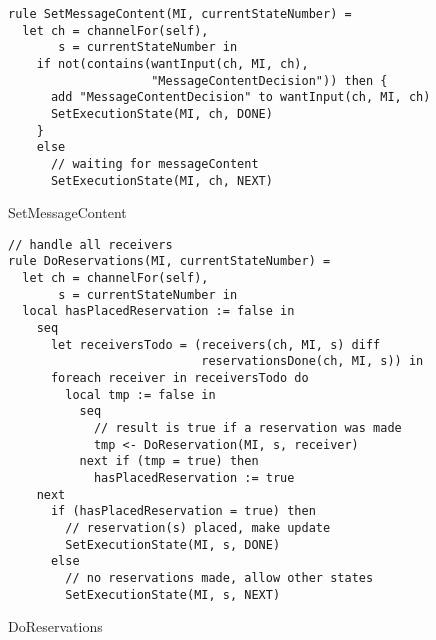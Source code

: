 \begin{listing}[H]
\begin{verbatim}
rule SetMessageContent(MI, currentStateNumber) =
  let ch = channelFor(self),
       s = currentStateNumber in
    if not(contains(wantInput(ch, MI, ch),
                    "MessageContentDecision")) then {
      add "MessageContentDecision" to wantInput(ch, MI, ch)
      SetExecutionState(MI, ch, DONE)
    }
    else
      // waiting for messageContent
      SetExecutionState(MI, ch, NEXT)
\end{verbatim}
\caption{SetMessageContent}
\label{lst:asm:SetMessageContent}
\end{listing}




\begin{listing}[H]
\begin{verbatim}
// handle all receivers
rule DoReservations(MI, currentStateNumber) =
  let ch = channelFor(self),
       s = currentStateNumber in
  local hasPlacedReservation := false in
    seq
      let receiversTodo = (receivers(ch, MI, s) diff
                           reservationsDone(ch, MI, s)) in
      foreach receiver in receiversTodo do
        local tmp := false in
          seq
            // result is true if a reservation was made
            tmp <- DoReservation(MI, s, receiver)
          next if (tmp = true) then
            hasPlacedReservation := true
    next
      if (hasPlacedReservation = true) then
        // reservation(s) placed, make update
        SetExecutionState(MI, s, DONE)
      else
        // no reservations made, allow other states
        SetExecutionState(MI, s, NEXT)
\end{verbatim}
\caption{DoReservations}
\label{lst:asm:DoReservations}
\end{listing}





